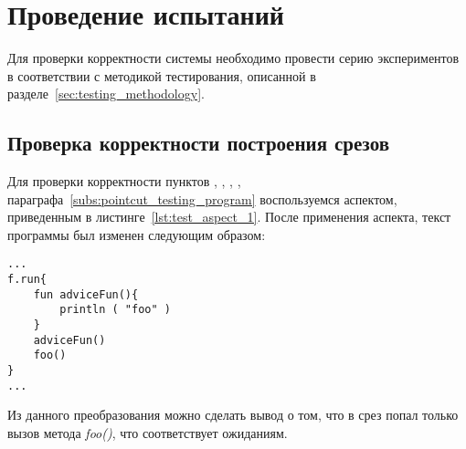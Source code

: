 \section{Проведение испытаний}
\label{sec:testing_run}
Для проверки корректности системы необходимо провести серию экспериментов в соответствии с методикой тестирования, описанной в разделе~\ref{sec:testing_methodology}.
\subsection{Проверка корректности построения срезов}
\label{sub:pointcut_building_tests}
Для проверки корректности пунктов
\quotes{\ref{list:method_name_check}},
\quotes{\ref{list:class_name_check}},
\quotes{\ref{list:method_params_check}},
\quotes{\ref{list:call_check}},
\quotes{\ref{list:reference_pointcut_check}} параграфа~\ref{subs:pointcut_testing_program} воспользуемся аспектом, приведенным в листинге~\ref{lst:test_aspect_1}.
После применения аспекта, текст программы был изменен следующим образом:
\begin{lstlisting}[style={java}, label={lst:result_of_weaving_1_1},
 caption={Результат применения аспекта, описанного в листинге~\ref{lst:test_aspect_1}, к тестовой программе}]
...
f.run{
	fun adviceFun(){
		println ( "foo" )
	}
	adviceFun()
	foo()
}
...
\end{lstlisting}
Из данного преобразования можно сделать вывод о том, что в срез попал только вызов метода \textit{foo()}, что соответствует ожиданиям.

